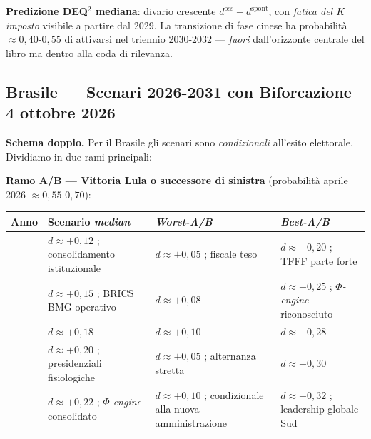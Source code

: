 \Conj{} \textbf{Predizione DEQ$^2$ mediana}: divario crescente
\(d^{\text{oss}} - d^{\text{spont}}\), con \emph{fatica del \(K\)
imposto} visibile a partire dal 2029. La transizione di fase cinese ha
probabilità \(\approx 0{,}40\)-\(0{,}55\) di attivarsi nel triennio
2030-2032 --- \emph{fuori} dall'orizzonte centrale del libro ma dentro
alla coda di rilevanza.

\subsection{Brasile --- Scenari 2026-2031 con Biforcazione 4 ottobre
2026}\label{brasile-scenari-2026-2031-con-biforcazione-4-ottobre-2026}

\Hypoth{} \textbf{Schema doppio.} Per il Brasile gli scenari sono
\emph{condizionali} all'esito elettorale. Dividiamo in due rami
principali:

\textbf{Ramo A/B --- Vittoria Lula o successore di sinistra}
(probabilità aprile 2026 \(\approx 0{,}55\)-\(0{,}70\)):

{\def\LTcaptype{none} %
{\small\begin{longtable}[]{@{}
  >{\raggedright\arraybackslash}p{}
  >{\raggedright\arraybackslash}p{}
  >{\raggedright\arraybackslash}p{}
  >{\raggedright\arraybackslash}p{}@{}}
\toprule\noalign{}
\begin{minipage}[b]{\linewidth}\raggedright
Anno
\end{minipage} & \begin{minipage}[b]{\linewidth}\raggedright
Scenario \emph{median}
\end{minipage} & \begin{minipage}[b]{\linewidth}\raggedright
\emph{Worst-A/B}
\end{minipage} & \begin{minipage}[b]{\linewidth}\raggedright
\emph{Best-A/B}
\end{minipage} \\
\midrule\noalign{}
\endhead
\bottomrule\noalign{}
\endlastfoot
2027 & \(d \approx +0{,}12\) ; consolidamento istituzionale &
\(d \approx +0{,}05\) ; fiscale teso & \(d \approx +0{,}20\) ; TFFF
parte forte \\
2028 & \(d \approx +0{,}15\) ; BRICS BMG operativo &
\(d \approx +0{,}08\) & \(d \approx +0{,}25\) ; \emph{$\Phi$-engine}
riconosciuto \\
2029 & \(d \approx +0{,}18\) & \(d \approx +0{,}10\) &
\(d \approx +0{,}28\) \\
2030 & \(d \approx +0{,}20\) ; presidenziali fisiologiche &
\(d \approx +0{,}05\) ; alternanza stretta & \(d \approx +0{,}30\) \\
2031 & \(d \approx +0{,}22\) ; \emph{$\Phi$-engine} consolidato &
\(d \approx +0{,}10\) ; condizionale alla nuova amministrazione &
\(d \approx +0{,}32\) ; leadership globale Sud \\
\end{longtable}}
}

